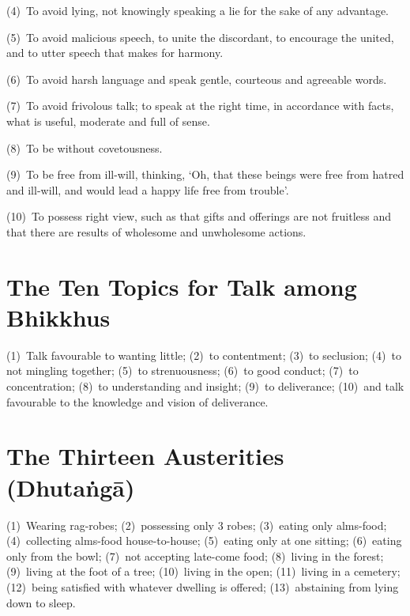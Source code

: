 (4)~To avoid lying, not knowingly speaking a lie for the sake of any advantage.

(5)~To avoid malicious speech, to unite the discordant, to encourage the united, and
to utter speech that makes for harmony.

(6)~To avoid harsh language and speak gentle, courteous and agreeable words.

(7)~To avoid frivolous talk; to speak at the right time, in accordance with facts,
what is useful, moderate and full of sense.

(8)~To be without covetousness.

(9)~To be free from ill-will, thinking, ‘Oh, that these beings were free from hatred
and ill-will, and would lead a happy life free from trouble’.

(10)~To possess right view, such as that gifts and offerings are not fruitless and
that there are results of wholesome and unwholesome actions.


\ifhandbookedition
\vspace*{-\baselineskip}
\fi

\section*{The Ten Topics for Talk among Bhikkhus}

(1)~Talk favourable to wanting little;
(2)~to contentment;
(3)~to seclusion;
(4)~to not mingling together;
(5)~to strenuousness;
(6)~to good conduct;
(7)~to concentration;
(8)~to understanding and insight;
(9)~to deliverance;
(10)~and talk favourable to the knowledge and vision of deliverance.


\ifhandbookedition
\vspace*{-\baselineskip}
\fi

\section*{The Thirteen Austerities (Dhutaṅgā)}

(1)~Wearing rag-robes;
(2)~possessing only 3 robes;
(3)~eating only alms-food;
(4)~collecting alms-food house-to-house;
(5)~eating only at one sitting;
(6)~eating only from the bowl;
(7)~not accepting late-come food;
(8)~living in the forest;
(9)~living at the foot of a tree;
(10)~living in the open;
(11)~living in a cemetery;
(12)~being satisfied with whatever dwelling is offered;
(13)~abstaining from lying down to sleep.\\

